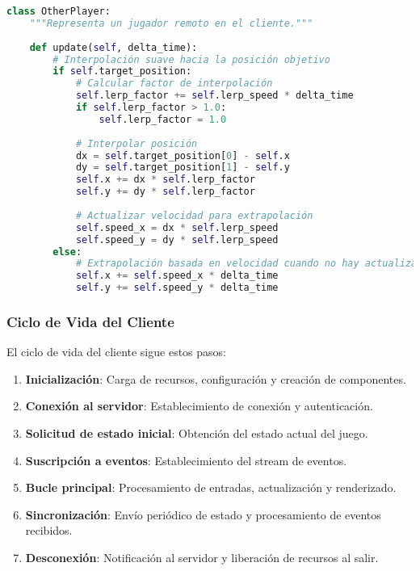 \documentclass[12pt,letterpaper]{article}
\begin{document}
\begin{lstlisting}[language=python, caption=Implementación de interpolación para jugadores remotos]
class OtherPlayer:
    """Representa un jugador remoto en el cliente."""
    
    def update(self, delta_time):
        # Interpolación suave hacia la posición objetivo
        if self.target_position:
            # Calcular factor de interpolación
            self.lerp_factor += self.lerp_speed * delta_time
            if self.lerp_factor > 1.0:
                self.lerp_factor = 1.0
            
            # Interpolar posición
            dx = self.target_position[0] - self.x
            dy = self.target_position[1] - self.y
            self.x += dx * self.lerp_factor
            self.y += dy * self.lerp_factor
            
            # Actualizar velocidad para extrapolación
            self.speed_x = dx * self.lerp_speed
            self.speed_y = dy * self.lerp_speed
        else:
            # Extrapolación basada en velocidad cuando no hay actualizaciones
            self.x += self.speed_x * delta_time
            self.y += self.speed_y * delta_time
\end{lstlisting}

\subsubsection{Ciclo de Vida del Cliente}

El ciclo de vida del cliente sigue estos pasos:

\begin{enumerate}
    \item \textbf{Inicialización}: Carga de recursos, configuración y creación de componentes.
    \item \textbf{Conexión al servidor}: Establecimiento de conexión y autenticación.
    \item \textbf{Solicitud de estado inicial}: Obtención del estado actual del juego.
    \item \textbf{Suscripción a eventos}: Establecimiento del stream de eventos.
    \item \textbf{Bucle principal}: Procesamiento de entradas, actualización y renderizado.
    \item \textbf{Sincronización}: Envío periódico de estado y procesamiento de eventos recibidos.
    \item \textbf{Desconexión}: Notificación al servidor y liberación de recursos al salir.
\end{enumerate}
\end{document}
